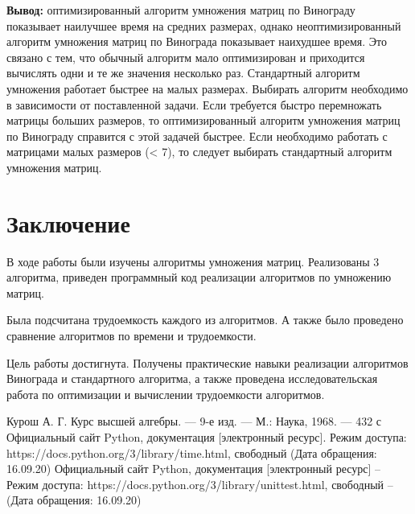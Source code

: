 \documentclass[12pt]{report}
\begin{document}
\textbf{Вывод: } оптимизированный алгоритм умножения матриц по Винограду показывает наилучшее время на средних размерах, однако неоптимизированный алгоритм умножения матриц по Винограда показывает наихудшее время. Это связано с тем, что обычный алгоритм мало оптимизирован и приходится вычислять одни и те же значения несколько раз. Стандартный алгоритм умножения работает быстрее на малых размерах. Выбирать алгоритм необходимо в зависимости от поставленной задачи. Если требуется быстро перемножать  матрицы больших размеров, то оптимизированный алгоритм умножения матриц по Винограду справится с этой задачей быстрее. Если необходимо работать с матрицами малых размеров (< 7), то следует выбирать стандартный алгоритм умножения матриц.

\chapter*{Заключение}

В ходе работы были изучены алгоритмы умножения матриц. Реализованы 3 алгоритма, приведен программный код реализации алгоритмов по умножению матриц.

Была подсчитана трудоемкость каждого из алгоритмов. А также было проведено сравнение алгоритмов по времени и трудоемкости.

Цель работы достигнута. Получены практические навыки реализации алгоритмов Винограда и стандартного алгоритма, а также проведена исследовательская работа по оптимизации и вычислении трудоемкости алгоритмов.


\begin{thebibliography}{2}
	 Курош А. Г. Курс высшей алгебры. — 9-е изд. — М.: Наука, 1968. — 432 с
	 Официальный сайт Python, документация [электронный ресурс]. Режим доступа: https://docs.python.org/3/library/time.html, свободный (Дата обращения: 16.09.20)
	 Официальный сайт Python, документация [электронный ресурс] – Режим доступа: https://docs.python.org/3/library/unittest.html, свободный – (Дата обращения: 16.09.20)
\end{thebibliography}
\end{document}
